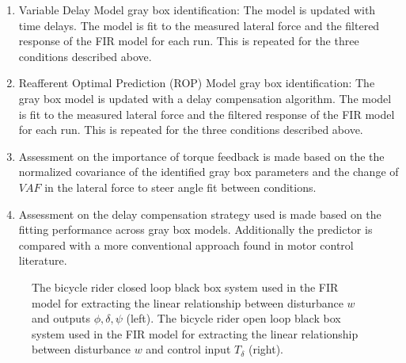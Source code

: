 \begin{enumerate}
    \item Variable Delay Model gray box identification: The model is updated with time delays. The model  is fit to the measured lateral force and the filtered response of the FIR model for each run. This is repeated for the three conditions described above. 
    \item Reafferent Optimal Prediction (ROP) Model gray box identification: The gray box model is updated with a delay compensation algorithm. The model is fit to the measured lateral force and the filtered response of the FIR model for each run. This is repeated for the three conditions described above.
    \item Assessment on the importance of torque feedback is made based on the the normalized covariance of the identified gray box parameters and the change of \ensuremath{\mathit{VAF}}  in the lateral force to steer angle fit between conditions.
    \item Assessment on the delay compensation strategy used is made based on the fitting performance across gray box models. Additionally the predictor is compared with a more conventional approach found in motor control literature. 

\end{enumerate}
\begin{figure}[h]
    \caption{The bicycle rider closed loop black box system used in the FIR model for extracting the linear relationship between disturbance \ensuremath{w} and outputs \ensuremath{\phi,\delta,\psi} (left). The bicycle rider open loop black box system used in the FIR model for extracting the linear relationship between disturbance \ensuremath{w} and control input \ensuremath{T_\delta} (right).  }
    \label{fig:blackbox}
\end{figure}



